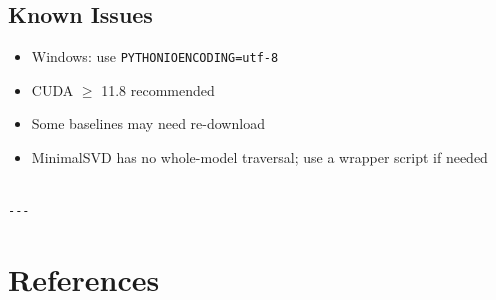 \subsection{Known Issues}

\begin{itemize}
\item Windows: use \texttt{PYTHONIOENCODING=utf-8}
\item CUDA $\ge$ 11.8 recommended
\item Some baselines may need re-download
\item MinimalSVD has no whole-model traversal; use a wrapper script if needed
\end{itemize}
\begin{lstlisting}

---
\end{lstlisting}


\section{References}

